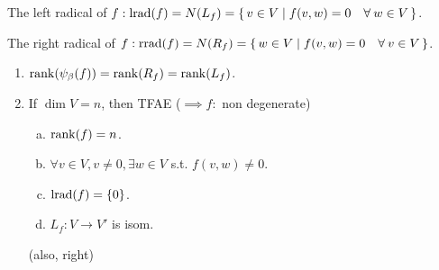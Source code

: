 The left radical of $f:
\Lrad(f) = N(L_f) = \{\, v\in V \mid f(v, w) = 0 \quad \forall w \in V \,\}$.

The right radical of $f:
\Rrad(f) = N(R_f) = \{\, w\in V \mid f(v, w) = 0 \quad \forall v \in V \,\}$.

\begin{exercise} \mbox{}
  \begin{enumerate}
    \item $\operatorname{rank}(\psi_\beta(f)) = \operatorname{rank}(R_f) = \operatorname{rank}(L_f)$.
    \item If $\dim V = n$, then TFAE ($\implies f:$ non degenerate)
      \begin{enumerate}[(a)]
        \item $\operatorname{rank}(f) = n$.
        \item $\forall v \in V, v \ne 0, \exists w \in V$ s.t. $f(v,w) \ne 0$.
        \item $\operatorname{lrad}(f) = \{0\}$.
        \item $L_f: V \to V'$ is isom.
      \end{enumerate}
      (also, right)
  \end{enumerate}
\end{exercise}

